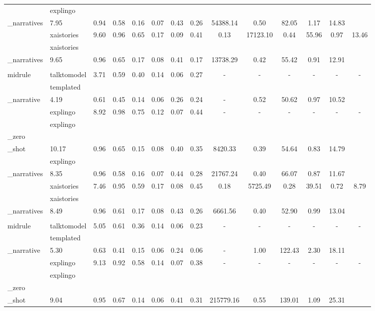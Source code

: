 {\begin{tabular}{llcccccccccccc}
     & explingo\\_narratives & 7.95 & 0.94 & 0.58 & 0.16 & 0.07 & 0.43 & 0.26 & 54388.14 & 0.50 & 82.05 & 1.17 & 14.83\\
     & xaistories & 9.60 & 0.96 & 0.65 & 0.17 & 0.09 & 0.41 & 0.13 & 17123.10 & 0.44 & 55.96 & 0.97 & 13.46\\
     & xaistories\\_narratives & 9.65 & 0.96 & 0.65 & 0.17 & 0.08 & 0.41 & 0.17 & 13738.29 & 0.42 & 55.42 & 0.91 & 12.91\\
    \\midrule
    \multirow{7}{*}{Diabetes} & talktomodel & 3.71 & 0.59 & 0.40 & 0.14 & 0.06 & 0.27 & - & - & - & - & - & -\\
     & templated\\_narrative & 4.19 & 0.61 & 0.45 & 0.14 & 0.06 & 0.26 & 0.24 & - & 0.52 & 50.62 & 0.97 & 10.52\\
     & explingo & 8.92 & 0.98 & 0.75 & 0.12 & 0.07 & 0.44 & - & - & - & - & - & -\\
     & explingo\\_zero\\_shot & 10.17 & 0.96 & 0.65 & 0.15 & 0.08 & 0.40 & 0.35 & 8420.33 & 0.39 & 54.64 & 0.83 & 14.79\\
     & explingo\\_narratives & 8.35 & 0.96 & 0.58 & 0.16 & 0.07 & 0.44 & 0.28 & 21767.24 & 0.40 & 66.07 & 0.87 & 11.67\\
     & xaistories & 7.46 & 0.95 & 0.59 & 0.17 & 0.08 & 0.45 & 0.18 & 5725.49 & 0.28 & 39.51 & 0.72 & 8.79\\
     & xaistories\\_narratives & 8.49 & 0.96 & 0.61 & 0.17 & 0.08 & 0.43 & 0.26 & 6661.56 & 0.40 & 52.90 & 0.99 & 13.04\\
    \\midrule
    \multirow{7}{*}{Fifa} & talktomodel & 5.05 & 0.61 & 0.36 & 0.14 & 0.06 & 0.23 & - & - & - & - & - & -\\
     & templated\\_narrative & 5.30 & 0.63 & 0.41 & 0.15 & 0.06 & 0.24 & 0.06 & - & 1.00 & 122.43 & 2.30 & 18.11\\
     & explingo & 9.13 & 0.92 & 0.58 & 0.14 & 0.07 & 0.38 & - & - & - & - & - & -\\
     & explingo\\_zero\\_shot & 9.04 & 0.95 & 0.67 & 0.14 & 0.06 & 0.41 & 0.31 & 215779.16 & 0.55 & 139.01 & 1.09 & 25.31\\

\end{tabular}}
